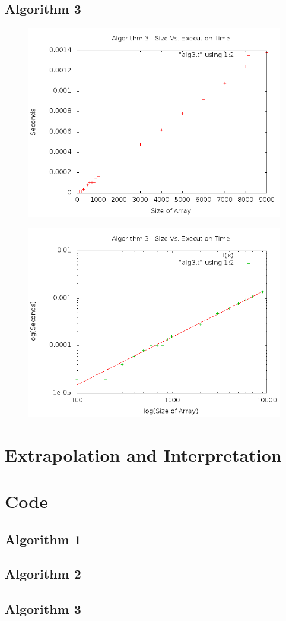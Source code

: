 \documentclass[a4paper,10pt]{article}
\begin{document}
		\subsection{Algorithm 3}
\begin{figure}[!htb]
\centering
\includegraphics[scale=.5]{timingfiles/alg3plot.png}
\end{figure}
\begin{figure}[!htb]
\centering
\includegraphics[scale=.5]{timingfiles/alg3plotlog.png}
\end{figure}
\newpage

	\section{Extrapolation and Interpretation}
	\newpage
	\section{Code}
		\subsection{Algorithm 1}
		
		\newpage
		\subsection{Algorithm 2}
		
		\newpage
		\subsection{Algorithm 3}
		
		
\end{document}
